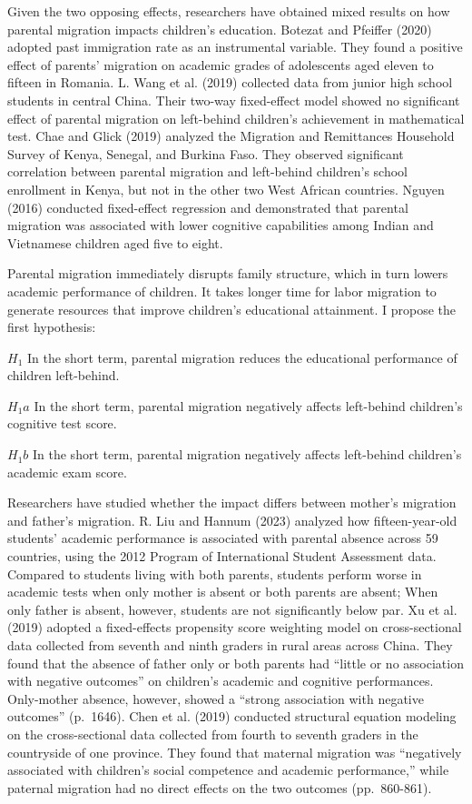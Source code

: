 \documentclass[
  man]{apa7}
\begin{document}
Given the two opposing effects, researchers have obtained mixed results on how parental migration impacts children's education. Botezat and Pfeiffer (2020) adopted past immigration rate as an instrumental variable. They found a positive effect of parents' migration on academic grades of adolescents aged eleven to fifteen in Romania. L. Wang et al. (2019) collected data from junior high school students in central China. Their two-way fixed-effect model showed no significant effect of parental migration on left-behind children's achievement in mathematical test. Chae and Glick (2019) analyzed the Migration and Remittances Household Survey of Kenya, Senegal, and Burkina Faso. They observed significant correlation between parental migration and left-behind children's school enrollment in Kenya, but not in the other two West African countries. Nguyen (2016) conducted fixed-effect regression and demonstrated that parental migration was associated with lower cognitive capabilities among Indian and Vietnamese children aged five to eight.

Parental migration immediately disrupts family structure, which in turn lowers academic performance of children. It takes longer time for labor migration to generate resources that improve children's educational attainment. I propose the first hypothesis:

\(H_1\) In the short term, parental migration reduces the educational performance of children left-behind.

\(H_1a\) In the short term, parental migration negatively affects left-behind children's cognitive test score.

\(H_1b\) In the short term, parental migration negatively affects left-behind children's academic exam score.

Researchers have studied whether the impact differs between mother's migration and father's migration. R. Liu and Hannum (2023) analyzed how fifteen-year-old students' academic performance is associated with parental absence across 59 countries, using the 2012 Program of International Student Assessment data. Compared to students living with both parents, students perform worse in academic tests when only mother is absent or both parents are absent; When only father is absent, however, students are not significantly below par. Xu et al. (2019) adopted a fixed-effects propensity score weighting model on cross-sectional data collected from seventh and ninth graders in rural areas across China. They found that the absence of father only or both parents had ``little or no association with negative outcomes'' on children's academic and cognitive performances. Only-mother absence, however, showed a ``strong association with negative outcomes'' (p.~1646). Chen et al. (2019) conducted structural equation modeling on the cross-sectional data collected from fourth to seventh graders in the countryside of one province. They found that maternal migration was ``negatively associated with children's social competence and academic performance,'' while paternal migration had no direct effects on the two outcomes (pp.~860-861).
\end{document}
